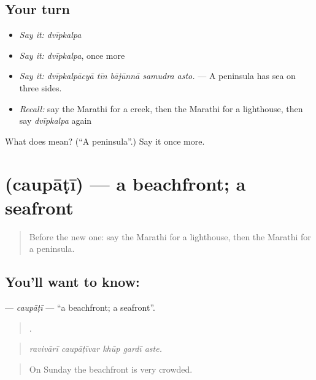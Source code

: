 \subsection*{Your turn}
\begin{itemize}
\raggedright
  \item \emph{Say it:} \emph{dvīpkalpa}
  \item \emph{Say it:} \emph{dvīpkalpa}, once more
  \item \emph{Say it:} \emph{dvīpkalpācyā tīn bājūnnā samudra asto.} — A peninsula has sea on three sides.
  \item \emph{Recall:} say the Marathi for a creek, then the Marathi for a lighthouse, then say \emph{dvīpkalpa} again
\end{itemize}

\begin{tcolorbox}[breakable,colback=teal!4,colframe=teal!35!black,title={Before you move on}]
What does  mean? (\textquotedblleft{}A peninsula\textquotedblright{}.) Say it once more.
\end{tcolorbox}
\section[\texorpdfstring{\mr{चौपाटी} (caupāṭī)}{चौपाटी (caupāṭī)}]{ (caupāṭī) — a beachfront; a seafront}

\label{lesson:MR-C410-caupati}



\begin{quote}
Before the new one: say the Marathi for a lighthouse, then the Marathi for a peninsula.
\end{quote}

\subsection*{You'll want to know: }
\textbf{} — \emph{caupāṭī} — \textquotedblleft{}a beachfront; a seafront\textquotedblright{}.

\begin{quote}
    .
\end{quote}

\begin{quote}
\emph{ravivārī caupāṭīvar khūp gardī aste.}
\end{quote}

\begin{quote}
On Sunday the beachfront is very crowded.
\end{quote}

